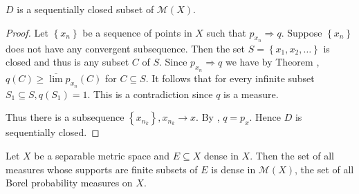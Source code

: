 \begin{lem}
	\( D \) is a sequentially closed subset of \( \mathscr { M } ( X ) \).
\end{lem}

\begin{proof}
	Let \( \left\{ x _ { n } \right\} \) be a sequence of points in \( X \) such that \( p _ { x _ { n } } \Rightarrow q \). Suppose \( \left\{ x _ { n } \right\} \) does not have any convergent subsequence. Then the set \( S = \left\{ x _ { 1 } , x _ { 2 } , \ldots \right\} \) is closed and thus is any subset \( C \) of \( S . \) Since \( p _ { x _ { n } } \Rightarrow q \) we have by Theorem , \( q ( C ) \geqslant \overline { \lim } p _ { x _ { n } } ( C ) \) for \( C \subseteq S \). It follows that for every infinite subset \( S _ { 1 } \subseteq S , q \left( S _ { 1 } \right) = 1 \). This is a contradiction since \( q \) is a measure.

	Thus there is a subsequence \( \left\{ x _ { n _ { k } } \right\} , x _ { n _ { k } } \rightarrow x . \) By , \( q = p _ { x } \). Hence \( D \) is sequentially closed.
\end{proof}

\begin{thm}
	\label{finite_support_approximation}
	Let \( X \) be a separable metric space and \( E \subseteq X \) dense in \( X  \). Then the set of all measures whose supports are finite subsets of \( E \) is dense in \( \mathscr{ M } ( X ) \), the set of all Borel probability measures on $X$.
\end{thm}

